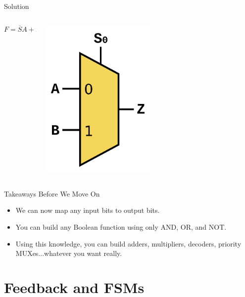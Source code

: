 \documentclass[aspectratio=169, 11pt, handout]{beamer}
\begin{document}
\begin{frame}{Solution}
    
\begin{columns}
\begin{column}{0.5\textwidth}
    $$F = \overline{S}A + SB$$
    \end{column}
    
\pause
\begin{column}{0.5\textwidth}
\begin{center}
    \includegraphics[width=0.5\textwidth]{537px-Multiplexer_2-to-1.png}
\end{center}
    \end{column}
    \end{columns}
\end{frame}

\begin{frame}{Takeaways Before We Move On}
    \begin{itemize}
        \item We can now map any input bits to output bits.\pause
        \item You can build any Boolean function using only AND, OR, and NOT.\pause
        \item Using this knowledge, you can build adders, multipliers, decoders, priority MUXes...whatever you want really.
    \end{itemize}
\end{frame}

\section{Feedback and FSMs}
\frame{\sectionpage}
\end{document}
